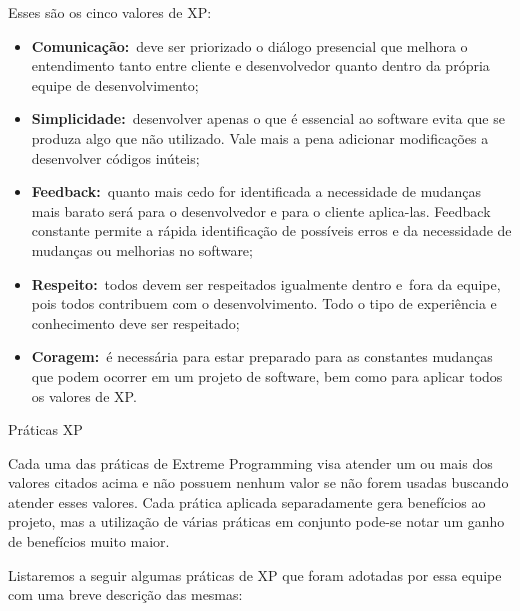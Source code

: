 {
Esses s\~ao os cinco valores de XP:}

\liststyleLFOi
\begin{itemize}
\item {
\textrm{\textbf{Comunica\c{c}\~ao:}}\textrm{\ deve ser priorizado o di\'alogo presencial que melhora o entendimento
tanto entre cliente e desenvolvedor quanto dentro da pr\'opria equipe de desenvolvimento;}}
\item {
\textrm{\textbf{Simplicidade:}}\textrm{\ desenvolver apenas o que \'e essencial ao software evita que se produza algo
que n\~ao utilizado. Vale mais a pena adicionar modifica\c{c}\~oes a desenvolver c\'odigos in\'uteis;}}
\item {
\textrm{\textbf{Feedback:}}\textrm{\ quanto mais cedo for identificada a necessidade de mudan\c{c}as mais barato ser\'a
para o desenvolvedor e para o cliente aplica-las. Feedback constante permite a r\'apida identifica\c{c}\~ao de
poss\'iveis erros e da necessidade de mudan\c{c}as ou melhorias no software;}}
\item {
\textrm{\textbf{Respeito:}}\textrm{\ todos devem ser respeitados igualmente dentro e\ fora da equipe, pois todos
contribuem com o desenvolvimento. Todo o tipo de experi\^encia e conhecimento deve ser respeitado;}}
\item {
\textrm{\textbf{Coragem:}}\textrm{\ \'e necess\'aria para estar preparado para as constantes mudan\c{c}as que podem
ocorrer em um projeto de software, bem como para aplicar todos os valores de XP.}}
\end{itemize}

\bigskip

{
Pr\'aticas XP}


\bigskip

{
Cada uma das pr\'aticas de Extreme Programming visa atender um ou mais dos valores citados acima e n\~ao possuem nenhum
valor se n\~ao forem usadas buscando atender esses valores. Cada pr\'atica aplicada separadamente gera benef\'icios ao
projeto, mas a utiliza\c{c}\~ao de v\'arias pr\'aticas em conjunto pode-se notar um ganho de benef\'icios muito maior.}


\bigskip

{
Listaremos a seguir algumas pr\'aticas de XP que foram adotadas por essa equipe com uma breve descri\c{c}\~ao das
mesmas:}

